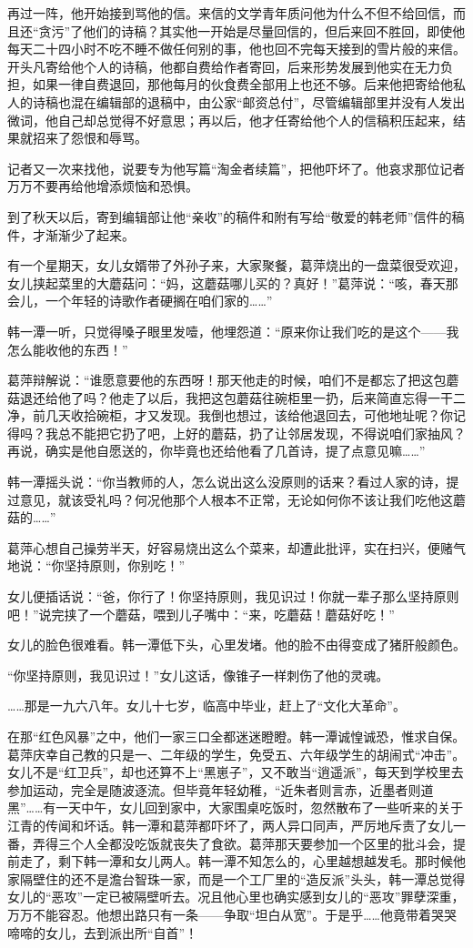 \par 再过一阵，他开始接到骂他的信。来信的文学青年质问他为什么不但不给回信，而且还“贪污”了他们的诗稿？其实他一开始是尽量回信的，但后来回不胜回，即使他每天二十四小时不吃不睡不做任何别的事，他也回不完每天接到的雪片般的来信。开头凡寄给他个人的诗稿，他都自费给作者寄回，后来形势发展到他实在无力负担，如果一律自费退回，那他每月的伙食费全部用上也还不够。后来他把寄给他私人的诗稿也混在编辑部的退稿中，由公家“邮资总付”，尽管编辑部里并没有人发出微词，他自己却总觉得不好意思；再以后，他才任寄给他个人的信稿积压起来，结果就招来了怨恨和辱骂。
\par 记者又一次来找他，说要专为他写篇“淘金者续篇”，把他吓坏了。他哀求那位记者万万不要再给他增添烦恼和恐惧。
\par 到了秋天以后，寄到编辑部让他“亲收”的稿件和附有写给“敬爱的韩老师”信件的稿件，才渐渐少了起来。
\par 有一个星期天，女儿女婿带了外孙子来，大家聚餐，葛萍烧出的一盘菜很受欢迎，女儿挟起菜里的大蘑菇问：“妈，这蘑菇哪儿买的？真好！”葛萍说：“咳，春天那会儿，一个年轻的诗歌作者硬搁在咱们家的……”
\par 韩一潭一听，只觉得嗓子眼里发噎，他埋怨道：“原来你让我们吃的是这个——我怎么能收他的东西！”
\par 葛萍辩解说：“谁愿意要他的东西呀！那天他走的时候，咱们不是都忘了把这包蘑菇退还给他了吗？他走了以后，我把这包蘑菇往碗柜里一扔，后来简直忘得一干二净，前几天收拾碗柜，才又发现。我倒也想过，该给他退回去，可他地址呢？你记得吗？我总不能把它扔了吧，上好的蘑菇，扔了让邻居发现，不得说咱们家抽风？再说，确实是他自愿送的，你毕竟也还给他看了几首诗，提了点意见嘛……”
\par 韩一潭摇头说：“你当教师的人，怎么说出这么没原则的话来？看过人家的诗，提过意见，就该受礼吗？何况他那个人根本不正常，无论如何你不该让我们吃他这蘑菇的……”
\par 葛萍心想自己操劳半天，好容易烧出这么个菜来，却遭此批评，实在扫兴，便赌气地说：“你坚持原则，你别吃！”
\par 女儿便插话说：“爸，你行了！你坚持原则，我见识过！你就一辈子那么坚持原则吧！”说完挟了一个蘑菇，喂到儿子嘴中：“来，吃蘑菇！蘑菇好吃！”
\par 女儿的脸色很难看。韩一潭低下头，心里发堵。他的脸不由得变成了猪肝般颜色。
\par “你坚持原则，我见识过！”女儿这话，像锥子一样刺伤了他的灵魂。
\par ……那是一九六八年。女儿十七岁，临高中毕业，赶上了“文化大革命”。
\par 在那“红色风暴”之中，他们一家三口全都迷迷瞪瞪。韩一潭诚惶诚恐，惟求自保。葛萍庆幸自己教的只是一、二年级的学生，免受五、六年级学生的胡闹式“冲击”。女儿不是“红卫兵”，却也还算不上“黑崽子”，又不敢当“逍遥派”，每天到学校里去参加运动，完全是随波逐流。但毕竟年轻幼稚，“近朱者则言赤，近墨者则道黑”……有一天中午，女儿回到家中，大家围桌吃饭时，忽然散布了一些听来的关于江青的传闻和坏话。韩一潭和葛萍都吓坏了，两人异口同声，严厉地斥责了女儿一番，弄得三个人全都没吃饭就丧失了食欲。葛萍那天要参加一个区里的批斗会，提前走了，剩下韩一潭和女儿两人。韩一潭不知怎么的，心里越想越发毛。那时候他家隔壁住的还不是澹台智珠一家，而是一个工厂里的“造反派”头头，韩一潭总觉得女儿的“恶攻”一定已被隔壁听去。况且他心里也确实感到女儿的“恶攻”罪孽深重，万万不能容忍。他想出路只有一条——争取“坦白从宽”。于是乎……他竟带着哭哭啼啼的女儿，去到派出所“自首”！

